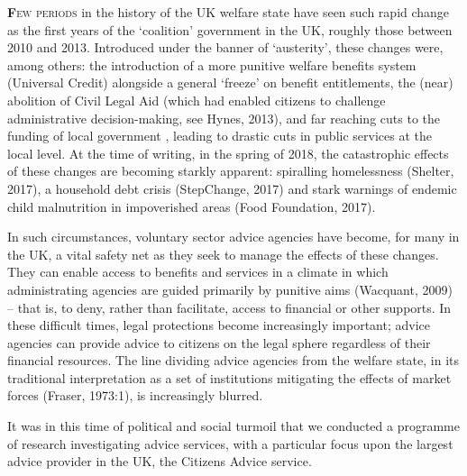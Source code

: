 
\lettrine[lines=2]{\bfseries\color{black}F}{ew periods} in the history of the UK welfare state have seen such rapid change as the first years of the ‘coalition’ government in the UK, roughly those between 2010 and 2013. Introduced under the banner of ‘austerity’, these changes were, among others: the introduction of a more punitive welfare benefits system (Universal Credit) alongside a general ‘freeze’ on benefit entitlements, the (near) abolition of Civil Legal Aid (which had enabled citizens to challenge administrative decision-making, see Hynes, 2013), and far reaching cuts to  the funding of local government%
    ,
leading to drastic cuts in public services at the local level. At the time of writing, in the spring of 2018, the catastrophic effects of these changes are becoming starkly apparent: spiralling homelessness (Shelter, 2017), a household debt crisis (StepChange, 2017) and stark warnings of endemic child malnutrition in impoverished areas (Food Foundation, 2017).
\par
In such circumstances, voluntary sector advice agencies have become, for many in the UK, a vital safety net as they seek to manage the effects of these changes. They can enable access to benefits and services in a climate in which administrating agencies are guided primarily by punitive aims (Wacquant, 2009) – that is, to deny, rather than facilitate, access to financial or other supports. In these difficult times, legal protections become increasingly important; advice agencies can provide advice to citizens on the legal sphere regardless of their financial resources. The line dividing advice agencies from the welfare state, in its traditional interpretation as a set of institutions mitigating the effects of market forces (Fraser, 1973:1), is increasingly blurred.
\par
It was in this time of political and social turmoil that we conducted a programme of research investigating advice services, with a particular focus upon the largest advice provider in the UK, the Citizens Advice service.%
